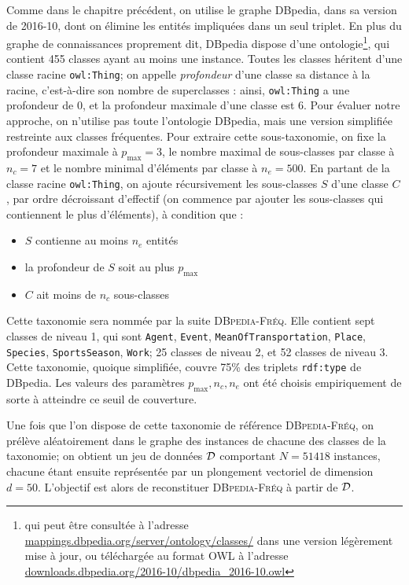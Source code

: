 Comme dans le chapitre précédent, on utilise le graphe DBpedia, dans sa version de 2016-10, dont on élimine les entités impliquées dans un seul triplet. En plus du graphe de connaissances proprement dit, DBpedia dispose d'une ontologie\footnote{qui peut être consultée à l'adresse \href{http://mappings.dbpedia.org/server/ontology/classes/}{mappings.dbpedia.org/server/ontology/classes/} dans une version légèrement mise à jour, ou téléchargée au format OWL à l'adresse \href{http://downloads.dbpedia.org/2016-10/dbpedia\_2016-10.owl}{downloads.dbpedia.org/2016-10/dbpedia\_2016-10.owl}}, qui contient 455 classes ayant au moins une instance. Toutes les classes héritent d'une classe racine \texttt{owl:Thing}; on appelle \textit{profondeur} d'une classe sa distance à la racine, c'est-à-dire son nombre de superclasses : ainsi, \texttt{owl:Thing} a une profondeur de 0, et la profondeur maximale d'une classe est 6. Pour évaluer notre approche, on n'utilise pas toute l'ontologie DBpedia, mais une version simplifiée restreinte aux classes fréquentes. %
Pour extraire cette sous-taxonomie, on fixe la profondeur maximale à $p_{\max}=3$, le nombre maximal de sous-classes par classe à $n_c=7$ et le nombre minimal d'éléments par classe à $n_e=500$. En partant de la classe racine \texttt{owl:Thing}, on ajoute récursivement les sous-classes $S$ d'une classe $C$, par ordre décroissant d'effectif (on commence par ajouter les sous-classes qui contiennent le plus d'éléments), à condition que : 
\begin{itemize}
    \item $S$ contienne au moins $n_e$ entités
    \item la profondeur de $S$ soit au plus $p_{\max}$
    \item $C$ ait moins de $n_c$ sous-classes
\end{itemize}

Cette taxonomie sera nommée par la suite \textsc{DBpedia-Fréq}. Elle contient sept classes de niveau 1, qui sont \texttt{Agent}, \texttt{Event}, \texttt{MeanOfTransportation}, \texttt{Place}, \texttt{Species}, \texttt{SportsSeason}, \texttt{Work}; 25 classes de niveau 2, et 52 classes de niveau 3. Cette taxonomie, quoique simplifiée, couvre 75\% des triplets \texttt{rdf:type} de DBpedia. Les valeurs des paramètres $p_{\max}, n_c, n_e$ ont été choisis empiriquement de sorte à atteindre ce seuil de couverture. 

Une fois que l'on dispose de cette taxonomie de référence \textsc{DBpedia-Fréq}, on prélève aléatoirement dans le graphe des instances de chacune des classes de la taxonomie; on obtient un jeu de données $\cal{D}$ comportant $N = 51 418$ instances, chacune étant ensuite représentée par un plongement vectoriel de dimension $d=50$. L'objectif est alors de reconstituer \textsc{DBpedia-Fréq} à partir de $\cal{D}$.


